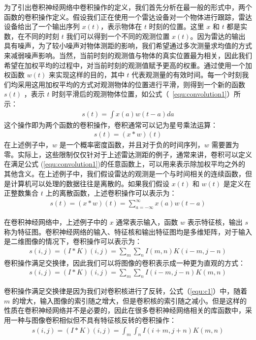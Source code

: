 为了引出卷积神经网络中卷积操作的定义，我们首先分析在最一般的形式中，两个函数的卷积操作定义。假设我们正在使用一个雷达设备对一个物体进行跟踪，雷达设备给出了一个输出序列 $x(t)$，表示物体在 $t$ 时刻的位置。这里 $x$ 和 $t$ 都是实数，在不同的时刻 $t$ 我们可以得到一个不同的观测位置 $x(t)$。因为雷达的输出具有噪声，为了较小噪声对物体测距的影响，我们希望通过多次测量求均值的方式来减弱噪声影响。当然，当前时刻的观测值与物体的真实位置最为相关，因此我们希望在加权平均的过程中，对当前时刻的观测值赋予更高的权重。通过使用一个加权函数 $w(t)$ 来实现这样的目的，其中 $t$ 代表观测量的有效时间。每一个时刻我们均采用这用加权平均的方式对观测物体的位置进行平滑，则得到一个新的函数 $s(t)$ ，表示 $t$ 时刻平滑后的观测物体位置，如公式（~\ref{equ:convolution1}）所示：
\begin{eqnarray} \label{equ:convolution1}
s(t)=\int{x(a)w(t-a)da}
\end{eqnarray}
这个操作即为两个函数的卷积操作，卷积通常可以记为星号乘法运算：
\begin{eqnarray} \label{equ:convolution2}
s(t)=(x*w)(t)
\end{eqnarray}
在上述例子中，$w$ 是一个概率密度函数，并且对于负的时间序列，$w$ 需要置为零。实际上，这些限制仅仅针对于上述雷达测距的例子，通常来讲，卷积可以定义在满足公式 (\ref{equ:convolution1})的任意函数上，可以用来表示除加权平均之外的其他含义。在上述例子中，我们假设雷达的观测是一个与时间相关的连续函数，但是计算机可以处理的数据往往是离散的。如果我们假设 $x(t)$ 和 $w(t)$ 是定义在正整数集合 $t$ 上的离散函数，上述卷积操作可以表示为：
\begin{eqnarray} \label{equ:convolution3}
s(t)=(x*w)(t)=\sum_{a=-\infty}^{\infty}x(a)w(t-a)
\end{eqnarray}

在卷积神经网络中，上述例子中的 $x$ 通常表示输入，函数 $w$ 表示特征核，输出 $s$ 称为特征图。卷积神经网络的输入、特征核和输出特征图均是多维矩阵，对于输入是二维图像的情况下，卷积操作可以表示为：
\begin{eqnarray} \label{equ:c1}
s(i,j)=(I*K)(i,j)=\sum_{m}\sum_{n}I(m,n)K(i-m,j-n)
\end{eqnarray}
卷积操作满足交换律，因此我们可以将图像的卷积表示成一种更为直观的方式：
\begin{eqnarray} \label{equ:c2}
s(i,j)=(I*K)(i,j)=\sum_{m}\sum_{n}I(i-m,j-n)K(m,n)
\end{eqnarray}

卷积操作满足交换律是因为我们对卷积核进行了反转，公式（\ref{equ:c1}）中，随着 $m$ 的增大，输入图像的索引随之增大，但是卷积核的索引随之减小。但是这样的性质在卷积神经网络并不是必要的，因此在很多卷积神经网络相关的库函数中，采用一种与图像卷积相似但不具有特征核反转的卷积操作：
\begin{eqnarray} \label{equ:c3}
s(i,j)=(I*K)(i,j)=\int_{m}\int_{n}I(i+m,j+n)K(m,n)
\end{eqnarray}


